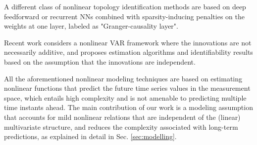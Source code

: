 A different class of nonlinear topology identification methods are based on deep feedforward or recurrent NNs \cite{tank2017interpretable,tank2021neural} combined with sparsity-inducing penalties on the weights at one layer, labeled as "Granger-causality layer".

Recent work \cite{morioka2021independent} considers a nonlinear VAR framework where the innovations are not necessarily additive, and proposes estimation algorithms and identifiability results based on the assumption that the innovations are independent.




All the aforementioned nonlinear modeling techniques are based on estimating nonlinear functions that predict the future time series values in the measurement space, which entails high complexity and is not amenable to predicting multiple time instants ahead. The main contribution of our work is a modeling assumption that accounts for mild nonlinear relations that are independent of the (linear) multivariate structure, and reduces the complexity associated with long-term predictions, as explained in detail in Sec. \ref{sec:modelling}.
